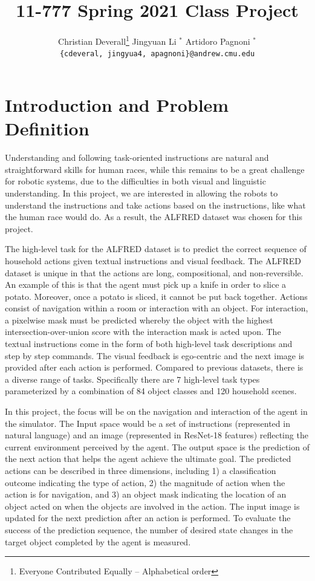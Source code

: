 \documentclass[11pt,a4paper]{article}
\title{11-777 Spring 2021 Class Project}
\author{
  Christian Deverall\thanks{\hspace{4pt}Everyone Contributed Equally -- Alphabetical order} \hspace{2em} Jingyuan Li $^*$ \hspace{2em} Artidoro Pagnoni $^*$ \\
  \texttt{\{cdeveral, jingyua4, apagnoni\}@andrew.cmu.edu}
  }
\date{}
\begin{document}
\maketitle

\section{Introduction and Problem Definition}
Understanding and following task-oriented instructions are natural and straightforward skills for human races, while this remains to be a great challenge for robotic systems, due to the difficulties in both visual and linguistic understanding. In this project, we are interested in allowing the robots to understand the instructions and take actions based on the instructions, like what the human race would do. As a result, the ALFRED dataset \cite{ALFRED20} was chosen for this project.

The high-level task for the ALFRED dataset is to predict the correct sequence of household actions given textual instructions and visual feedback. The ALFRED dataset is unique in that the actions are long, compositional, and non-reversible. An example of this is that the agent must pick up a knife in order to slice a potato. Moreover, once a potato is sliced, it cannot be put back together. Actions consist of navigation within a room or interaction with an object. For interaction, a pixelwise mask must be predicted whereby the object with the highest intersection-over-union score with the interaction mask is acted upon. The textual instructions come in the form of both high-level task descriptions and step by step commands. The visual feedback is ego-centric and the next image is provided after each action is performed. Compared to previous datasets, there is a diverse range of tasks. Specifically there are 7 high-level task types parameterized by a combination of 84 object classes and 120 household scenes.

In this project, the focus will be on the navigation and interaction of the agent in the simulator. The Input space would be a set of instructions (represented in natural language) and an image (represented in ResNet-18 \cite{He_2016_CVPR} features) reflecting the current environment perceived by the agent. The output space is the prediction of the next action that helps the agent achieve the ultimate goal. The predicted actions can be described in three dimensions, including 1) a classification outcome indicating the type of action, 2) the magnitude of action when the action is for navigation, and 3) an object mask indicating the location of an object acted on when the objects are involved in the action. The input image is updated for the next prediction after an action is performed. To evaluate the success of the prediction sequence, the number of desired state changes in the target object completed by the agent is measured.
\end{document}
